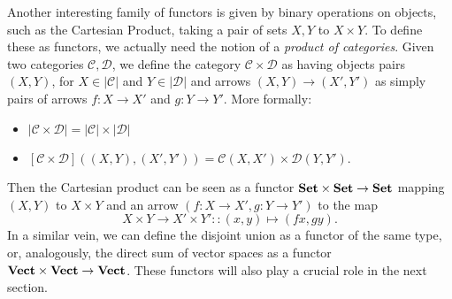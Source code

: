 Another interesting family of functors is given by binary operations on objects, such as the Cartesian Product, taking a pair of sets $X,Y$ to $X\times Y$. To define these as functors, we actually need the notion of a \emph{product of categories}. Given two categories $\mathcal{C},\mathcal{D}$, we define the category $\mathcal{C}\times\mathcal{D}$ as having objects pairs $(X,Y)$, for $X\in|\mathcal{C}|$ and $Y\in|\mathcal{D}|$ and arrows $(X,Y)\to (X',Y')$ as simply pairs of arrows $f:X\to X'$ and $g:Y\to Y'$. More formally:
\begin{itemize}
\item $|\mathcal{C}\times\mathcal{D}|=|\mathcal{C}|\times|\mathcal{D}|$
\item $[\mathcal{C}\times\mathcal{D}]((X,Y),(X',Y'))=\mathcal{C}(X,X')\times\mathcal{D}(Y,Y')$.
\end{itemize}
Then the Cartesian product can be seen as a functor $\mathbf{Set}\times\mathbf{Set}\to\mathbf{Set}$ mapping $(X,Y)$ to $X\times Y$ and an arrow $(f:X\to X',g:Y\to Y')$ to the map \[X\times Y\to X'\times Y'::(x,y)\mapsto (fx,gy).\]
In a similar vein, we can define the disjoint union as a functor of the same type, or, analogously, the direct sum of vector spaces as a functor $\mathbf{Vect}\times\mathbf{Vect}\to\mathbf{Vect}$. These functors will also play a crucial role in the next section.

